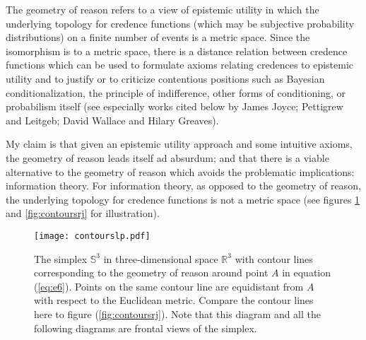 \documentclass[11pt]{article} \usepackage{october} \onehalfspacing
\begin{document}
The geometry of reason refers to a view of epistemic utility in which
the underlying topology for credence functions (which may be
subjective probability distributions) on a finite number of events is
a metric space. Since the isomorphism is to a metric space, there is a
distance relation between credence functions which can be used to
formulate axioms relating credences to epistemic utility and to
justify or to criticize contentious positions such as Bayesian
conditionalization, the principle of indifference, other forms of
conditioning, or probabilism itself (see especially works cited below
by James Joyce; Pettigrew and Leitgeb; David Wallace and Hilary
Greaves).

My claim is that given an epistemic utility approach and some
intuitive axioms, the geometry of reason leads itself ad absurdum; and
that there is a viable alternative to the geometry of reason which
avoids the problematic implications: information theory. For
information theory, as opposed to the geometry of reason, the
underlying topology for credence functions is not a metric space (see
figures \ref{fig:contourslp} and \ref{fig:contoursrj} for
illustration).

\begin{figure}[ht]
  \begin{flushright}
    \begin{minipage}[h]{.7\linewidth}
      \texttt{[image: contourslp.pdf]}
      \caption{\footnotesize The simplex $\mathbb{S}^{3}$ in
        three-dimensional space $\mathbb{R}^{3}$ with contour lines
        corresponding to the geometry of reason around point $A$ in
        equation (\ref{eq:e6}). Points on the same contour line are
        equidistant from $A$ with respect to the Euclidean metric.
        Compare the contour lines here to figure
        (\ref{fig:contoursrj}). Note that this diagram and all the
        following diagrams are frontal views of the simplex.}
      \label{fig:contourslp}
    \end{minipage}
  \end{flushright}
\end{figure}
\end{document}
